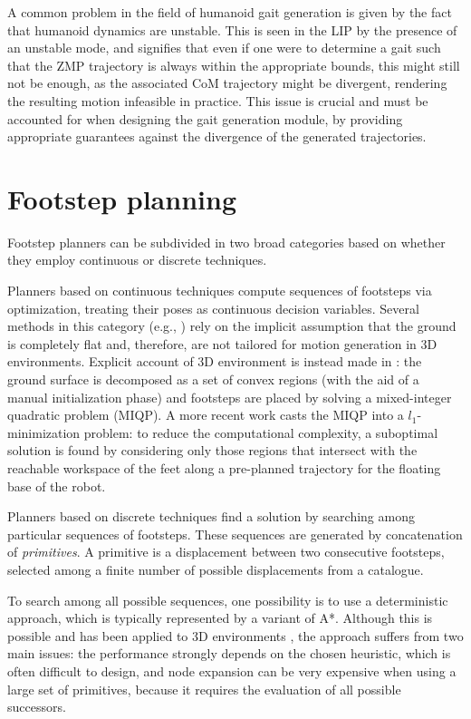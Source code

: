 A common problem in the field of humanoid gait generation is given by the fact that humanoid dynamics are unstable. This is seen in the LIP by the presence of an unstable mode, and signifies that even if one were to determine a gait such that the ZMP trajectory is always within the appropriate bounds, this might still not be enough, as the associated CoM trajectory might be divergent, rendering the resulting motion infeasible in practice. This issue is crucial and must be accounted for when designing the gait generation module, by providing appropriate guarantees against the divergence of the generated trajectories.

\section{Footstep planning}

Footstep planners can be subdivided in two broad categories based on whether they employ continuous or discrete techniques.

Planners based on continuous techniques compute sequences of footsteps via optimization, treating their poses as continuous decision variables. 
Several methods in this category (e.g., \cite{IbBiPa:14, Hong_2011TSMC, Kasadei2021SNAS}) rely on the implicit assumption that the ground is completely flat and, therefore, are not tailored for motion generation in 3D environments.
Explicit account of 3D environment is instead made in \cite{DeTe:14}: the ground surface is decomposed as a set of convex regions (with the aid of a manual initialization phase) and footsteps are placed by solving a mixed-integer quadratic problem (MIQP). 
A more recent work \cite{Song_RAL2021} casts the MIQP into a $l_1$-minimization problem: 
to reduce the computational complexity, a suboptimal solution is found by considering only those regions that intersect with the reachable workspace of the feet along a pre-planned trajectory for the floating base of the robot.

Planners based on discrete techniques find a solution by searching among particular sequences of footsteps. These sequences are generated by concatenation of \emph{primitives}. A primitive is a displacement between two consecutive footsteps, selected among a finite number of possible displacements from a catalogue.

To search among all possible sequences, one possibility is to use a deterministic approach, which is typically represented by a variant of A*. Although this is possible and has been applied to 3D environments \cite{Griffin_ICRA2019}, the approach suffers from two main issues: the performance strongly depends on the chosen heuristic, which is often difficult to design, and node expansion can be very expensive when using a large set of primitives, because it requires the evaluation of all possible successors.

